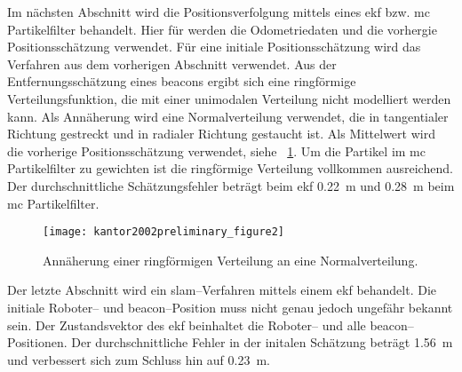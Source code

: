 Im nächsten Abschnitt wird die Positionsverfolgung mittels eines \Gls{ekf} bzw. \Gls{mc} Partikelfilter behandelt. Hier für werden die Odometriedaten und die vorhergie Positionsschätzung verwendet. Für eine initiale Positionsschätzung wird das Verfahren aus dem vorherigen Abschnitt verwendet. Aus der Entfernungsschätzung eines \Glspl{beacon} ergibt sich eine ringförmige Verteilungsfunktion, die mit einer unimodalen Verteilung nicht modelliert werden kann. Als Annäherung wird eine Normalverteilung verwendet, die in tangentialer Richtung gestreckt und in radialer Richtung gestaucht ist. Als Mittelwert wird die vorherige Positionsschätzung verwendet, siehe \figurename~\ref{fig:kantor2002preliminary_figure2}. Um die Partikel im \Gls{mc} Partikelfilter zu gewichten ist die ringförmige Verteilung vollkommen ausreichend. Der durchschnittliche Schätzungsfehler beträgt beim \Gls{ekf} \SI{0.22}{\metre} und \SI{0.28}{\metre} beim \Gls{mc} Partikelfilter.

\begin{figure}[htbp]
	\centering
	\texttt{[image: kantor2002preliminary\_figure2]}
	\caption{Annäherung einer ringförmigen Verteilung an eine Normalverteilung.}
	\label{fig:kantor2002preliminary_figure2}
\end{figure}

Der letzte Abschnitt wird ein \Gls{slam}--Verfahren mittels einem \Gls{ekf} behandelt. Die initiale Roboter-- und \Gls{beacon}--Position muss nicht genau jedoch ungefähr bekannt sein. Der Zustandsvektor des \Gls{ekf} beinhaltet die Roboter-- und alle \Gls{beacon}--Positionen. Der durchschnittliche Fehler in der initalen Schätzung beträgt \SI{1.56}{\metre} und verbessert sich zum Schluss hin auf \SI{0.23}{\metre}.


\begin{comment}
------------------------------------------------------------------------------------------
- \cite{kurth2003experimental}
	- Experimental results in range-only localization with radio (82)
\end{comment}


\begin{comment}
------------------------------------------------------------------------------------------
- \cite{olson2004robust}
	- Robust range-only beacon localization (264)
	- Wie funktioniert die Exploration Strategy?
		- Die Ungünstigeste strategy ist das geradeausfahren mit einem beacon links und rechts.
		- Das Gradientenfeld der abstanddifferenz zwischen den beiden beacons führt einen auf den optimalen weg um die Abstandsdifferenz zu maximieren. (Aktive Exploration)
\end{comment}
